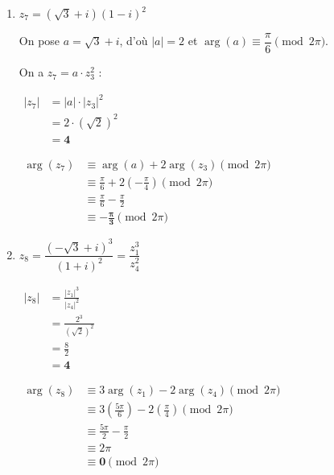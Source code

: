 \documentclass[12pt,a4paper]{article}
\begin{document}
\begin{enumerate}
    $
    \begin{aligned}
        \arg(z_6) &\equiv \arg(z_1) - \arg(z_4) \pmod{2\pi}\\
        &\equiv \frac{5\pi}{6} - \frac{\pi}{4} \pmod{2\pi}\\
        &\equiv \frac{10\pi - 3\pi}{12}\\ 
        &\equiv \mathbf{\frac{7\pi}{12}} \pmod{2\pi}
    \end{aligned}
    $

    \item $z_7 = (\sqrt{3} + i)(1 - i)^2$
    
    On pose $a = \sqrt{3} + i$, d'où $|a| = 2$ et $\arg(a) \equiv \dfrac{\pi}{6} \pmod{2\pi}$. 
    
    On a $z_7 = a \cdot z_3^2$ :
    
    $
    \begin{aligned}
        |z_7| &= |a| \cdot |z_3|^2\\
        &= 2 \cdot (\sqrt{2})^2\\
        &= \mathbf{4}
    \end{aligned}
    $
    
    $
    \begin{aligned}
        \arg(z_7) &\equiv \arg(a) + 2\arg(z_3) \pmod{2\pi}\\
        &\equiv \frac{\pi}{6} + 2\left(-\frac{\pi}{4}\right) \pmod{2\pi}\\
        &\equiv \frac{\pi}{6} - \frac{\pi}{2}\\ 
        &\equiv \mathbf{-\frac{\pi}{3}} \pmod{2\pi}
    \end{aligned}
    $
    
    \item $z_8 = \dfrac{(-\sqrt{3} + i)^3}{(1 + i)^2} = \dfrac{z_1^3}{z_4^2}$
    
    $
    \begin{aligned}
        |z_8| &= \frac{|z_1|^3}{|z_4|^2}\\
        &= \frac{2^3}{(\sqrt{2})^2}\\
        &= \frac{8}{2}\\ 
        &= \mathbf{4}
    \end{aligned}
    $
    
    $
    \begin{aligned}
        \arg(z_8) &\equiv 3\arg(z_1) - 2\arg(z_4) \pmod{2\pi}\\
        &\equiv 3\left(\frac{5\pi}{6}\right) - 2\left(\frac{\pi}{4}\right) \pmod{2\pi}\\
        &\equiv \frac{5\pi}{2} - \frac{\pi}{2}\\ 
        &\equiv 2\pi\\ 
        &\equiv \mathbf{0} \pmod{2\pi}
    \end{aligned}
    $


\end{enumerate}
\end{document}
